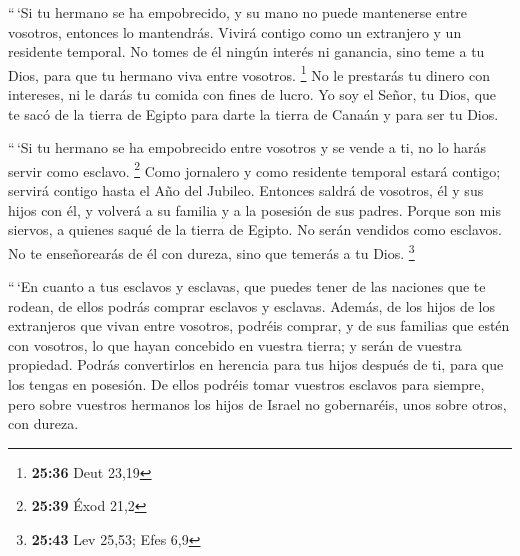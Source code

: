  ``\,`Si tu hermano se ha empobrecido, y su mano no puede
mantenerse entre vosotros, entonces lo mantendrás. Vivirá contigo como
un extranjero y un residente temporal.  No tomes de él
ningún interés ni ganancia, sino teme a tu Dios, para que tu hermano
viva entre vosotros. \footnote{\textbf{25:36} Deut 23,19}
 No le prestarás tu dinero con intereses, ni le darás tu
comida con fines de lucro.  Yo soy el Señor, tu Dios, que
te sacó de la tierra de Egipto para darte la tierra de Canaán y para ser
tu Dios.

 ``\,`Si tu hermano se ha empobrecido entre vosotros y se
vende a ti, no lo harás servir como esclavo. \footnote{\textbf{25:39}
  Éxod 21,2}  Como jornalero y como residente temporal
estará contigo; servirá contigo hasta el Año del Jubileo.
 Entonces saldrá de vosotros, él y sus hijos con él, y
volverá a su familia y a la posesión de sus padres. 
Porque son mis siervos, a quienes saqué de la tierra de Egipto. No serán
vendidos como esclavos.  No te enseñorearás de él con
dureza, sino que temerás a tu Dios. \footnote{\textbf{25:43} Lev 25,53;
  Efes 6,9}

 ``\,`En cuanto a tus esclavos y esclavas, que puedes
tener de las naciones que te rodean, de ellos podrás comprar esclavos y
esclavas.  Además, de los hijos de los extranjeros que
vivan entre vosotros, podréis comprar, y de sus familias que estén con
vosotros, lo que hayan concebido en vuestra tierra; y serán de vuestra
propiedad.  Podrás convertirlos en herencia para tus
hijos después de ti, para que los tengas en posesión. De ellos podréis
tomar vuestros esclavos para siempre, pero sobre vuestros hermanos los
hijos de Israel no gobernaréis, unos sobre otros, con dureza.

